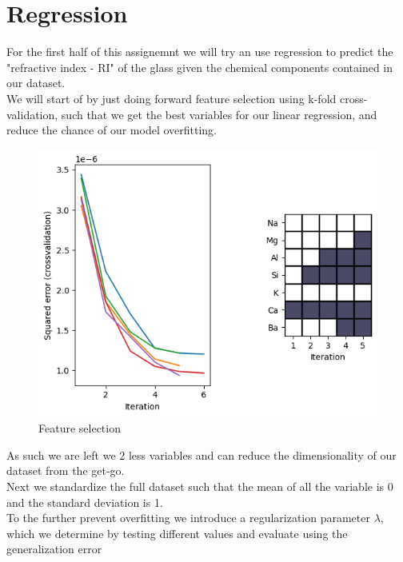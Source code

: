 \section{Regression}
For the first half of this assignemnt we will try an use regression to predict the "refractive index - RI" of the glass given the chemical components contained in our dataset.\\
We will start of by just doing forward feature selection using k-fold cross-validation, such that we get the best variables for our linear regression, and reduce the chance of our model overfitting.\\
\begin{figure}
    \centering
    \includegraphics[width=12cm]{images/featureselection.png}
    \caption{Feature selection}
    \label{fig:fig_select}
\end{figure}
As such we are left we 2 less variables and can reduce the dimensionality of our dataset from the get-go. \\

Next we standardize the full dataset such that the mean of all the variable is 0 and the standard deviation is 1. \color[red]{It is worth noting that the helper function "rlr_validate" also standardizes its internal data partitions as a part of kfold cross-validation when it selects values of $\lambda$} \\
To the further prevent overfitting we introduce a regularization parameter $\lambda$, which we determine by testing different values and evaluate using the generalization error
